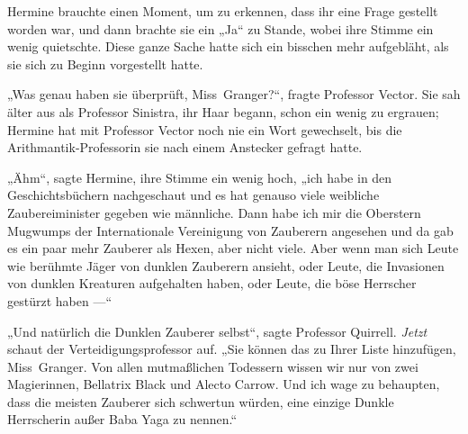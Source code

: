 Hermine brauchte einen Moment, um zu erkennen, dass ihr eine Frage gestellt worden war, und dann brachte sie ein
„Ja“ zu Stande, wobei ihre Stimme ein wenig quietschte. Diese ganze Sache hatte sich ein bisschen mehr aufgebläht, als sie sich zu Beginn vorgestellt hatte.

„Was genau haben sie überprüft, Miss~Granger?“, fragte Professor Vector. Sie sah älter aus als Professor Sinistra, ihr Haar begann, schon ein wenig zu ergrauen; Hermine hat mit Professor Vector noch nie ein Wort gewechselt, bis die Arithmantik-Professorin sie nach einem Anstecker gefragt hatte.

„Ähm“, sagte Hermine, ihre Stimme ein wenig hoch, „ich habe in den Geschichtsbüchern nachgeschaut und es hat genauso viele weibliche Zaubereiminister gegeben wie männliche. Dann habe ich mir die Oberstern Mugwumps der Internationale Vereinigung von Zauberern angesehen und da gab es ein paar mehr Zauberer als Hexen, aber nicht viele. Aber wenn man sich Leute wie berühmte Jäger von dunklen Zauberern ansieht, oder Leute, die Invasionen von dunklen Kreaturen aufgehalten haben, oder Leute, die böse Herrscher gestürzt haben —“

„Und natürlich die Dunklen Zauberer selbst“, sagte Professor Quirrell. \emph{Jetzt} schaut der Verteidigungsprofessor auf.
„Sie können das zu Ihrer Liste hinzufügen, Miss~Granger. Von allen mutmaßlichen Todessern wissen wir nur von zwei Magierinnen, Bellatrix Black und Alecto Carrow. Und ich wage zu behaupten, dass die meisten Zauberer sich schwertun würden, eine einzige Dunkle Herrscherin außer Baba Yaga zu nennen.“

